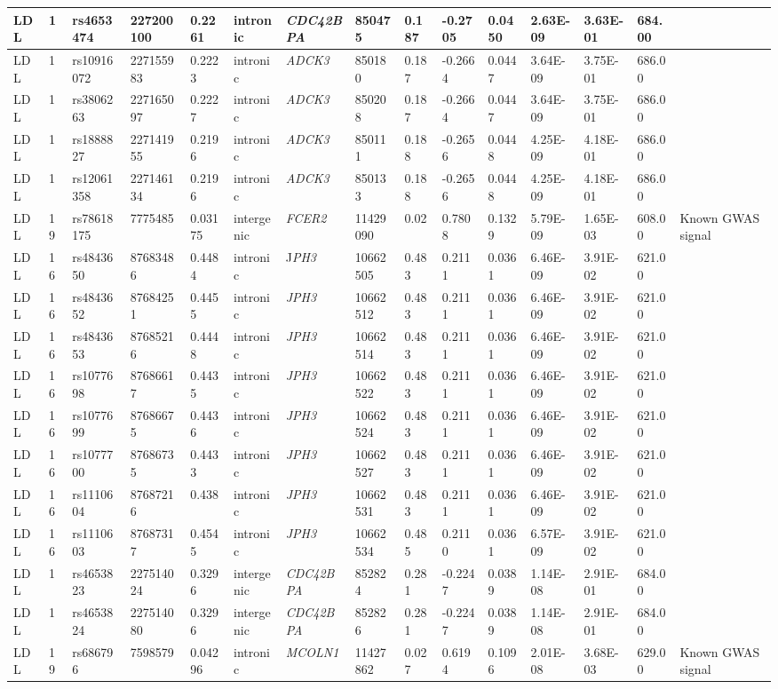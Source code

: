 \begin{landscape}
\begin{table}
\begin{adjustbox}{max width=\linewidth}
\begin{tabular}{@{}p{2cm}|p{0.5cm}p{2cm}p{2cm}p{1.5cm}p{3cm}p{2.5cm}p{1.5cm}p{1cm}p{2cm}p{2cm}p{2cm}p{2cm}p{1.5cm}p{4cm}@{}}
LDL&1&rs4653474&227200100&0.2261&intronic&\emph{CDC42BPA}&850475&0.187&-0.2705&0.0450&2.63E-09&3.63E-01&684.00&\\ \hline
LDL&1&rs10916072&227155983&0.2223&intronic&\emph{ADCK3}&850180&0.187&-0.2664&0.0447&3.64E-09&3.75E-01&686.00&\\ \hline
LDL&1&rs3806263&227165097&0.2227&intronic&\emph{ADCK3}&850208&0.187&-0.2664&0.0447&3.64E-09&3.75E-01&686.00&\\ \hline
LDL&1&rs1888827&227141955&0.2196&intronic&\emph{ADCK3}&850111&0.188&-0.2656&0.0448&4.25E-09&4.18E-01&686.00&\\ \hline
LDL&1&rs12061358&227146134&0.2196&intronic&\emph{ADCK3}&850133&0.188&-0.2656&0.0448&4.25E-09&4.18E-01&686.00&\\ \hline
LDL&19&rs78618175&7775485&0.03175&intergenic&\emph{FCER2}&11429090&0.02&0.7808&0.1329&5.79E-09&1.65E-03&608.00&Known GWAS signal\\ \hline
LDL&16&rs4843650&87683486&0.4484&intronic&J\emph{PH3}&10662505&0.483&0.2111&0.0361&6.46E-09&3.91E-02&621.00&\\ \hline
LDL&16&rs4843652&87684251&0.4455&intronic&\emph{JPH3}&10662512&0.483&0.2111&0.0361&6.46E-09&3.91E-02&621.00&\\ \hline
LDL&16&rs4843653&87685216&0.4448&intronic&\emph{JPH3}&10662514&0.483&0.2111&0.0361&6.46E-09&3.91E-02&621.00&\\ \hline
LDL&16&rs1077698&87686617&0.4435&intronic&\emph{JPH3}&10662522&0.483&0.2111&0.0361&6.46E-09&3.91E-02&621.00&\\ \hline
LDL&16&rs1077699&87686675&0.4436&intronic&\emph{JPH3}&10662524&0.483&0.2111&0.0361&6.46E-09&3.91E-02&621.00&\\ \hline
LDL&16&rs1077700&87686735&0.4433&intronic&\emph{JPH3}&10662527&0.483&0.2111&0.0361&6.46E-09&3.91E-02&621.00&\\ \hline
LDL&16&rs1110604&87687216&0.438&intronic&\emph{JPH3}&10662531&0.483&0.2111&0.0361&6.46E-09&3.91E-02&621.00&\\ \hline
LDL&16&rs1110603&87687317&0.4545&intronic&\emph{JPH3}&10662534&0.485&0.2110&0.0361&6.57E-09&3.91E-02&621.00&\\ \hline
LDL&1&rs4653823&227514024&0.3296&intergenic&\emph{CDC42BPA}&852824&0.281&-0.2247&0.0389&1.14E-08&2.91E-01&684.00&\\ \hline
LDL&1&rs4653824&227514080&0.3296&intergenic&\emph{CDC42BPA}&852826&0.281&-0.2247&0.0389&1.14E-08&2.91E-01&684.00&\\ \hline
LDL&19&rs686796&7598579&0.04296&intronic&\emph{MCOLN1}&11427862&0.027&0.6194&0.1096&2.01E-08&3.68E-03&629.00&Known GWAS signal\\ \hline

\end{tabular}
\end{adjustbox}
\end{table}
\end{landscape}
